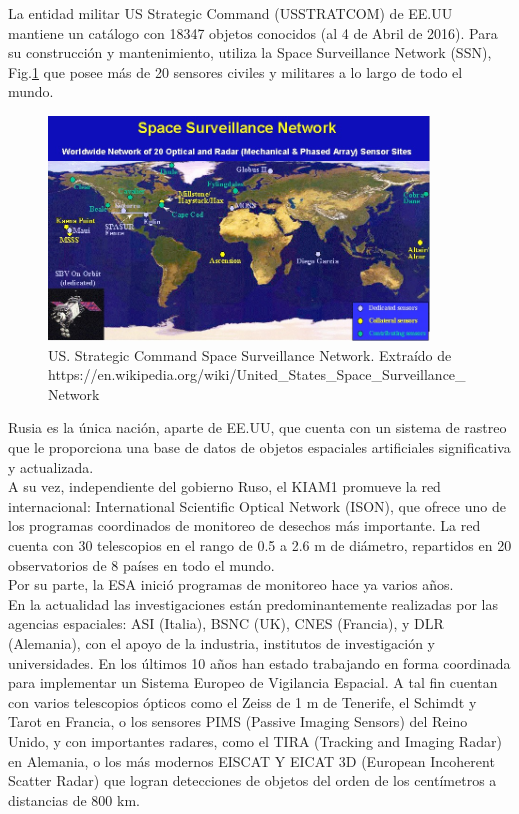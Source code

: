 La entidad militar US Strategic Command (USSTRATCOM) de EE.UU mantiene un catálogo con 18347 objetos conocidos (al 4 de Abril de 2016). Para su construcci\'on y mantenimiento, utiliza la Space Surveillance Network (SSN), Fig.\ref{fig:usnet}  que posee m\'as de 20 sensores civiles y militares a lo largo de todo el mundo.\\

\begin{figure}[!h]
  \centering
  \includegraphics[width=0.9\textwidth]{imagenes/SpSNet}
  \caption[USSTRATCOM - SSN]{US. Strategic Command Space Surveillance Network. Extra\'ido de https://en.wikipedia.org/wiki/United\_States\_Space\_Surveillance\_Network}
  \label{fig:usnet}
\end{figure}

Rusia es la única nación, aparte de EE.UU, que cuenta con un sistema de rastreo que le proporciona una base de datos de objetos espaciales artificiales significativa y actualizada.\\
A su vez, independiente del gobierno Ruso, el KIAM1 promueve la red internacional: International Scientific Optical Network (ISON), que ofrece uno de los programas coordinados de monitoreo de desechos más importante.
La red cuenta con 30 telescopios en el rango de 0.5 a 2.6 m de diámetro, repartidos en 20 observatorios de 8 países en todo el mundo.\\

Por su parte, la ESA inició programas de monitoreo hace ya varios años.\\
En la actualidad las investigaciones están predominantemente realizadas por las agencias espaciales: ASI (Italia), BSNC (UK), CNES (Francia), y DLR (Alemania), con el apoyo de la industria, institutos de investigación y universidades. En los últimos 10 años han estado trabajando en forma coordinada para implementar un Sistema Europeo de Vigilancia Espacial.
A tal fin cuentan con varios telescopios ópticos como el Zeiss de 1 m de Tenerife, el Schimdt y Tarot en Francia, o los sensores PIMS (Passive Imaging Sensors) del Reino Unido, y con importantes radares, como el TIRA (Tracking and Imaging Radar) en Alemania, o los más modernos EISCAT Y EICAT 3D (European Incoherent Scatter Radar) que logran detecciones de objetos del orden de los centímetros a distancias de 800 km.


